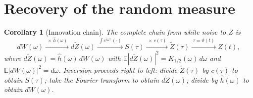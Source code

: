 \documentclass[11pt,a4paper]{article}
\newtheorem{corollary}[theorem]{Corollary}
\begin{document}
\section{Recovery of the random measure}

\begin{corollary}[Innovation chain]
\label{cor:chain}
The complete chain from white noise to $Z$ is
\begin{equation}
dW(\omega)
\xrightarrow{\;\times\,\hat{h}(\omega)\;}
d\widetilde{Z}(\omega)
\xrightarrow{\;\int e^{i\omega\tau}\,(\cdot)\;}
S(\tau)
\xrightarrow{\;\times\,c(\tau)\;}
\widetilde{Z}(\tau)
\xrightarrow{\;\tau=\vartheta(t)\;}
Z(t),
\end{equation}
where $d\widetilde{Z}(\omega)=\hat{h}(\omega)\,dW(\omega)$ with
$\mathbb{E}|d\widetilde{Z}(\omega)|^2=K_{1/2}(\omega)\,d\omega$ and
$\mathbb{E}|dW(\omega)|^2=d\omega$.
Inversion proceeds right to left: divide $\widetilde{Z}(\tau)$ by $c(\tau)$
to obtain $S(\tau)$; take the Fourier transform to obtain
$d\widetilde{Z}(\omega)$; divide by $\hat{h}(\omega)$ to obtain $dW(\omega)$.
\end{corollary}
\end{document}
